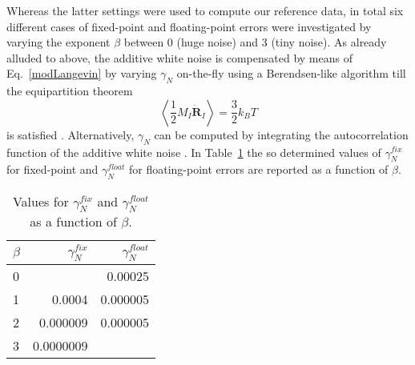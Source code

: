 Whereas the latter settings were used to compute our reference data, in total six different cases of fixed-point and floating-point errors were investigated by varying the exponent $\beta$ between 0 (huge noise) and 3 (tiny noise). %
As already alluded to above, the additive white noise is compensated by means of Eq.~\ref{modLangevin} by varying $\gamma_N$ on-the-fly using a Berendsen-like algorithm till the equipartition theorem
\begin{equation}
\left\langle \frac{1}{2} M_I \dot{\textbf{R}}_{I} \right\rangle = \frac{3}{2} k_B T
\end{equation}
is satisfied \cite{Berendsen,TDKwater,TDKrev}. Alternatively, $\gamma_N$ can be computed by integrating the autocorrelation function of the additive white noise \cite{RZK}.
In Table~\ref{tab:gamma} the so determined values of \textit{\(\gamma_N^{fix}\)} for fixed-point and \textit{\(\gamma_N^{float}\)} for floating-point errors are reported as a function of \textit{\(\beta\)}. %
\begin{table}
  \caption{Values for \textit{\(\gamma_N^{fix}\)} and \textit{\(\gamma_N^{float}\)} as a function of \textit{\(\beta\)}.}
  \label{tab:gamma}
  \begin{tabular}{lrr}
    \textit{\(\beta\)} & \textit{\(\gamma_N^{fix}\)} & \textit{\(\gamma_N^{float}\)} \\
    \hline
    0 &           & 0.00025  \\
    1 & 0.0004    & 0.000005 \\
    2 & 0.000009  & 0.000005 \\
    3 & 0.0000009 & 
  \end{tabular}
\end{table}


